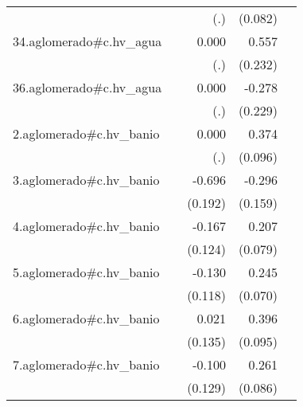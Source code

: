 {\begin{longtable}{l*{4}{D{.}{.}{-1}}}
            &                     &         (.)         &     (0.082)         &                     \\
\addlinespace
34.aglomerado#c.hv\_agua&                     &       0.000         &       0.557\sym{*}  &                     \\
            &                     &         (.)         &     (0.232)         &                     \\
\addlinespace
36.aglomerado#c.hv\_agua&                     &       0.000         &      -0.278         &                     \\
            &                     &         (.)         &     (0.229)         &                     \\
\addlinespace
2.aglomerado#c.hv\_banio&                     &       0.000         &       0.374\sym{***}&                     \\
            &                     &         (.)         &     (0.096)         &                     \\
\addlinespace
3.aglomerado#c.hv\_banio&                     &      -0.696\sym{***}&      -0.296         &                     \\
            &                     &     (0.192)         &     (0.159)         &                     \\
\addlinespace
4.aglomerado#c.hv\_banio&                     &      -0.167         &       0.207\sym{**} &                     \\
            &                     &     (0.124)         &     (0.079)         &                     \\
\addlinespace
5.aglomerado#c.hv\_banio&                     &      -0.130         &       0.245\sym{***}&                     \\
            &                     &     (0.118)         &     (0.070)         &                     \\
\addlinespace
6.aglomerado#c.hv\_banio&                     &       0.021         &       0.396\sym{***}&                     \\
            &                     &     (0.135)         &     (0.095)         &                     \\
\addlinespace
7.aglomerado#c.hv\_banio&                     &      -0.100         &       0.261\sym{**} &                     \\
            &                     &     (0.129)         &     (0.086)         &                     \\

\end{longtable}}
